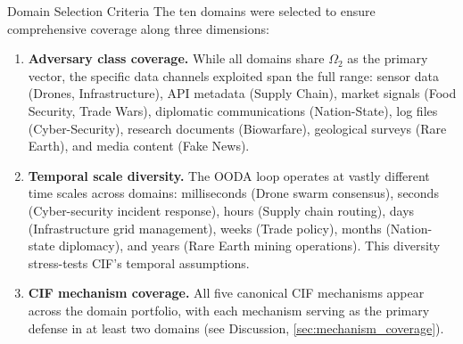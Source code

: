 \documentclass[
  ignorenonframetext,
]{beamer}
\begin{document}
\begin{frame}[allowframebreaks]{Domain Selection Criteria}
\protect{}\label{domain-selection-criteria}
The ten domains were selected to ensure comprehensive coverage along
three dimensions:

\begin{enumerate}
\item
  \textbf{Adversary class coverage.} While all domains share
  \(\Omega_2\) as the primary vector, the specific data channels
  exploited span the full range: sensor data (Drones, Infrastructure),
  API metadata (Supply Chain), market signals (Food Security, Trade
  Wars), diplomatic communications (Nation-State), log files
  (Cyber-Security), research documents (Biowarfare), geological surveys
  (Rare Earth), and media content (Fake News).
\item
  \textbf{Temporal scale diversity.} The OODA loop operates at vastly
  different time scales across domains: milliseconds (Drone swarm
  consensus), seconds (Cyber-security incident response), hours (Supply
  chain routing), days (Infrastructure grid management), weeks (Trade
  policy), months (Nation-state diplomacy), and years (Rare Earth mining
  operations). This diversity stress-tests CIF's temporal assumptions.
\item
  \textbf{CIF mechanism coverage.} All five canonical CIF mechanisms
  appear across the domain portfolio, with each mechanism serving as the
  primary defense in at least two domains (see Discussion,
  \cref{sec:mechanism_coverage}).
\end{enumerate}
\end{frame}
\end{document}
